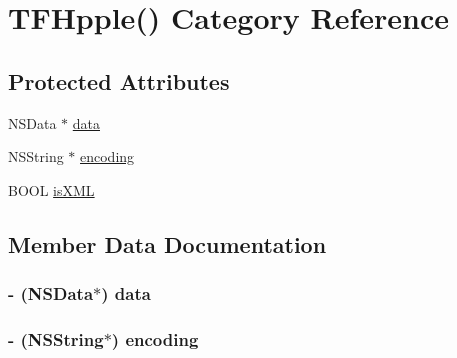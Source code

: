 \hypertarget{category_t_f_hpple_07_08}{}\section{T\+F\+Hpple() Category Reference}
\label{category_t_f_hpple_07_08}
\subsection*{Protected Attributes}
\begin{DoxyCompactItemize}
\item 
N\+S\+Data $\ast$ \hyperlink{category_t_f_hpple_07_08_a674b2440c6e918dcf6b323786bd29ecb}{data}
\item 
N\+S\+String $\ast$ \hyperlink{category_t_f_hpple_07_08_a0b3df7514a4fe4565450e3a19f390e0a}{encoding}
\item 
B\+O\+O\+L \hyperlink{category_t_f_hpple_07_08_ad2ae7e483fc2540b363e72a46a4cb196}{is\+X\+M\+L}
\end{DoxyCompactItemize}


\subsection{Member Data Documentation}
\hypertarget{category_t_f_hpple_07_08_a674b2440c6e918dcf6b323786bd29ecb}{}
\subsubsection[{data}]{\setlength{\rightskip}{0pt plus 5cm}-\/ (N\+S\+Data$\ast$) data\hspace{0.3cm}{\ttfamily [protected]}}\label{category_t_f_hpple_07_08_a674b2440c6e918dcf6b323786bd29ecb}
\hypertarget{category_t_f_hpple_07_08_a0b3df7514a4fe4565450e3a19f390e0a}{}
\subsubsection[{encoding}]{\setlength{\rightskip}{0pt plus 5cm}-\/ (N\+S\+String$\ast$) encoding\hspace{0.3cm}{\ttfamily [protected]}}\label{category_t_f_hpple_07_08_a0b3df7514a4fe4565450e3a19f390e0a}
\hypertarget{category_t_f_hpple_07_08_ad2ae7e483fc2540b363e72a46a4cb196}{}
